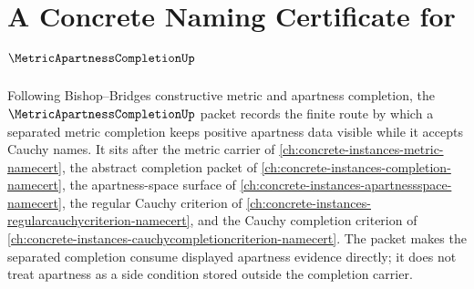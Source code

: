 \chapter{A Concrete Naming Certificate for $\MetricApartnessCompletionUp$}
\label{ch:concrete-instances-metric-apartness-completion-namecert}

Following Bishop--Bridges constructive metric and apartness completion, the $\MetricApartnessCompletionUp$ packet records the finite route by which a separated metric completion keeps positive apartness data visible while it accepts Cauchy names. It sits after the metric carrier of \autoref{ch:concrete-instances-metric-namecert}, the abstract completion packet of \autoref{ch:concrete-instances-completion-namecert}, the apartness-space surface of \autoref{ch:concrete-instances-apartnessspace-namecert}, the regular Cauchy criterion of \autoref{ch:concrete-instances-regularcauchycriterion-namecert}, and the Cauchy completion criterion of \autoref{ch:concrete-instances-cauchycompletioncriterion-namecert}. The packet makes the separated completion consume displayed apartness evidence directly; it does not treat apartness as a side condition stored outside the completion carrier.


